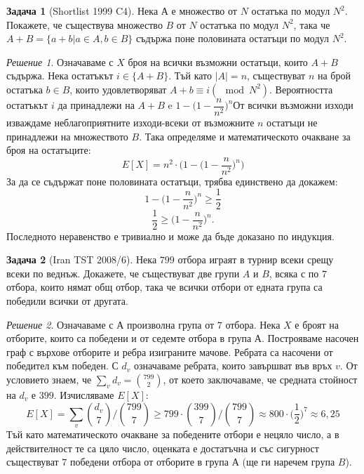 \documentclass[11 pt, a4paper]{article}
\theoremstyle{definition}
\newtheorem{p}{Задача}
\theoremstyle{remark}
\newtheorem*{s}{Решение}
\begin{document}
\begin{p}[Shortlist 1999 C4]

Нека $А$ е множество от $N$ остатъка по модул $N^2$. Покажете, че съществува множество $B$ от $N$ остатъка по модул $N^2$, така че 
$A+B=\{a+b|a\in A,b\in B\}$ съдържа поне половината остатъци по модул $N^2$.\par
\end{p}
\begin{s}
Означаваме с $X$ броя на всички възможни остатъци, които $A+B$ съдържа. Нека остатъкът $i\in \{A+B\}$. Тъй като $|A|=n$, съществуват $n$ на брой остатъка $b\in B$, които удовлетворяват $A+b\equiv i(\mod{N^2})$. Вероятността остатъкът $i$ да принадлежи на $A+B$ e $1-\bigg(1-\dfrac{n}{n^2}\bigg)^n$От всички възможни изходи изваждаме неблагоприятните изходи-всеки от възможните $n$ остатъци не принадлежи на множеството $B$. Така определяме и математическото очакване за броя на остатъците:
\begin{equation*}
E[X]=n^2\cdot\bigg(1-\bigg(1-\dfrac{n}{n^2}\bigg)^n\bigg)
\end{equation*}
За да се съдържат поне половината остатъци, трябва единствено да докажем:
\begin{equation*}
1-\bigg(1-\dfrac{n}{n^2}\bigg)^n\geq\dfrac{1}{2}
\end{equation*}
\begin{equation*}
\dfrac{1}{2}\geq \bigg(1-\dfrac{n}{n^2}\bigg)^n.
\end{equation*}
Последното неравенство е тривиално и може да бъде доказано по индукция. \\
\end{s}
\begin{p}[Iran TST 2008/6]

Нека $799$ отбора играят в турнир всеки срещу всеки по веднъж. Докажете, че съществуват две групи $A$ и $B$, всяка с по $7$ отбора, които нямат общ отбор, така че всички отбори от едната група са победили всички от другата.\par
\end{p}
\begin{s}
Означаваме с $А$ произволна група от $7$ отбора. Нека $X$ е броят на отборите, които са победени и от седемте отбора в група $А$. Построяваме насочен граф с върхове отборите и ребра изиграните мачове. Ребрата са насочени от победител към победен. С $d_v$ означаваме ребрата, които завършват във връх $v$. От условието знаем, че $\sum_v d_v={{799}\choose{2}}$, от което заключаваме, че средната стойност на $d_v$ е $399$. Изчисляваме $E[X]$:
\begin{equation*}
E[X]=\sum_v{d_v\choose{7}}/{799\choose{7}}\geq 799\cdot{399\choose{7}}/{799\choose{7}}\approx 800\cdot\bigg(\dfrac{1}{2}\bigg)^7\approx 6,25
\end{equation*}
Тъй като математическото очакване за победените отбори е нецяло число, а в действителност те са цяло число, оценката е достатъчна и със сигурност съществуват $7$ победени отбора от отборите в група $А$ (ще ги наречем група $B$).
\end{s}
\end{document}
